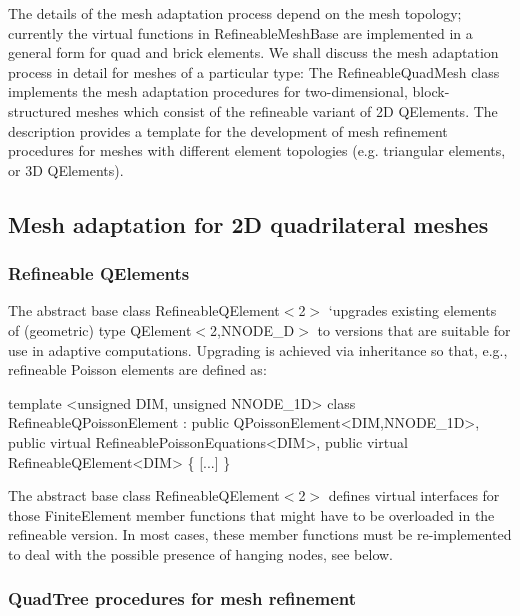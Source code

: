 The details of the mesh adaptation process depend on the mesh topology; currently the virtual functions in {\ttfamily Refineable\+Mesh\+Base} are implemented in a general form for quad and brick elements. We shall discuss the mesh adaptation process in detail for meshes of a particular type\+: The {\ttfamily Refineable\+Quad\+Mesh} class implements the mesh adaptation procedures for two-\/dimensional, block-\/structured meshes which consist of the refineable variant of 2D {\ttfamily Q\+Elements}. The description provides a template for the development of mesh refinement procedures for meshes with different element topologies (e.\+g. triangular elements, or 3D {\ttfamily Q\+Elements}).\hypertarget{index_RefineableQuadMesh_section}{}\subsection{Mesh adaptation for 2\+D quadrilateral meshes}\label{index_RefineableQuadMesh_section}
\hypertarget{index_RefineableQElementsInmeshes}{}\subsubsection{Refineable Q\+Elements}\label{index_RefineableQElementsInmeshes}
The abstract base class {\ttfamily Refineable\+Q\+Element$<$2$>$} `upgrades\textquotesingle{} existing elements of (geometric) type {\ttfamily Q\+Element$<$2,\+N\+N\+O\+D\+E\+\_\+D$>$} to versions that are suitable for use in adaptive computations. \textquotesingle{}Upgrading\textquotesingle{} is achieved via inheritance so that, e.\+g., refineable Poisson elements are defined as\+: 
\begin{DoxyCode}
\textcolor{keyword}{template} <\textcolor{keywordtype}{unsigned} DIM, \textcolor{keywordtype}{unsigned} NNODE\_1D>
\textcolor{keyword}{class }RefineableQPoissonElement : \textcolor{keyword}{public} QPoissonElement<DIM,NNODE\_1D>,
\textcolor{keyword}{public} \textcolor{keyword}{virtual} RefineablePoissonEquations<DIM>,
\textcolor{keyword}{public} \textcolor{keyword}{virtual} RefineableQElement<DIM>
\{
 [...]
\}
\end{DoxyCode}
 The abstract base class {\ttfamily Refineable\+Q\+Element$<$2$>$} defines virtual interfaces for those {\ttfamily Finite\+Element} member functions that might have to be overloaded in the refineable version. In most cases, these member functions must be re-\/implemented to deal with the possible presence of hanging nodes, see below.\hypertarget{index_QuadTreeInMeshes}{}\subsubsection{Quad\+Tree procedures for mesh refinement}\label{index_QuadTreeInMeshes}
